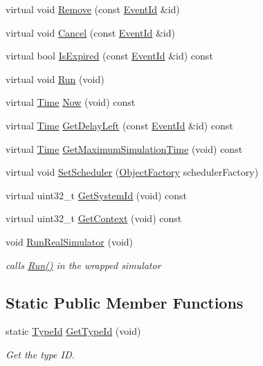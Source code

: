 \begin{DoxyCompactItemize}
\item 
virtual void \hyperlink{classns3_1_1VisualSimulatorImpl_a49c58408dc2f944c055645a64d134e91}{Remove} (const \hyperlink{classns3_1_1EventId}{Event\+Id} \&id)
\item 
virtual void \hyperlink{classns3_1_1VisualSimulatorImpl_a1fa5c2e8b2a3d6bc0774a4b9856c9a3c}{Cancel} (const \hyperlink{classns3_1_1EventId}{Event\+Id} \&id)
\item 
virtual bool \hyperlink{classns3_1_1VisualSimulatorImpl_a8d91e45c780464ae33eb8c81a86aad22}{Is\+Expired} (const \hyperlink{classns3_1_1EventId}{Event\+Id} \&id) const 
\item 
virtual void \hyperlink{classns3_1_1VisualSimulatorImpl_a999f492381133da2fdb13273623098d5}{Run} (void)
\item 
virtual \hyperlink{classns3_1_1Time}{Time} \hyperlink{classns3_1_1VisualSimulatorImpl_a57559161a49b6ff2e374e2c342848303}{Now} (void) const 
\item 
virtual \hyperlink{classns3_1_1Time}{Time} \hyperlink{classns3_1_1VisualSimulatorImpl_a362f49a30ffbb40a80012d67103175b2}{Get\+Delay\+Left} (const \hyperlink{classns3_1_1EventId}{Event\+Id} \&id) const 
\item 
virtual \hyperlink{classns3_1_1Time}{Time} \hyperlink{classns3_1_1VisualSimulatorImpl_a2e3d2fe57bea6b53ee7df05db535407a}{Get\+Maximum\+Simulation\+Time} (void) const 
\item 
virtual void \hyperlink{classns3_1_1VisualSimulatorImpl_a004f90e1fcad32c50571db8fb5531989}{Set\+Scheduler} (\hyperlink{classns3_1_1ObjectFactory}{Object\+Factory} scheduler\+Factory)
\item 
virtual uint32\+\_\+t \hyperlink{classns3_1_1VisualSimulatorImpl_ac6547c46c80742bd8e34fef1310b56df}{Get\+System\+Id} (void) const 
\item 
virtual uint32\+\_\+t \hyperlink{classns3_1_1VisualSimulatorImpl_a240f84a8405648762cec89c7b3839a8a}{Get\+Context} (void) const 
\item 
void \hyperlink{classns3_1_1VisualSimulatorImpl_a6f50a594146f0a2c21cf9c4987f91682}{Run\+Real\+Simulator} (void)
\begin{DoxyCompactList}\small\item\em calls \hyperlink{classns3_1_1VisualSimulatorImpl_a999f492381133da2fdb13273623098d5}{Run()} in the wrapped simulator \end{DoxyCompactList}\end{DoxyCompactItemize}
\subsection*{Static Public Member Functions}
\begin{DoxyCompactItemize}
\item 
static \hyperlink{classns3_1_1TypeId}{Type\+Id} \hyperlink{classns3_1_1VisualSimulatorImpl_a224e17ca3af56d55526ad1f44efcce98}{Get\+Type\+Id} (void)
\begin{DoxyCompactList}\small\item\em Get the type ID. \end{DoxyCompactList}\end{DoxyCompactItemize}
